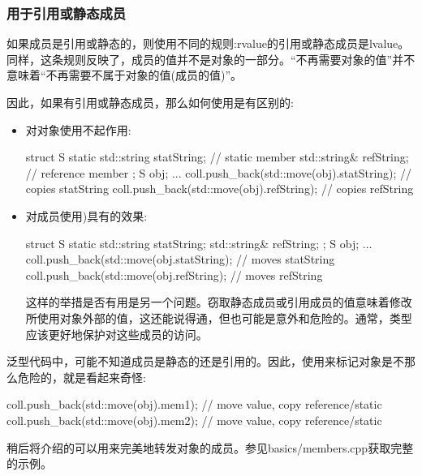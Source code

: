 \subsubsection{用于引用或静态成员}

如果成员是引用或静态的，则使用不同的规则:rvalue的引用或静态成员是lvalue。同样，这条规则反映了，成员的值并不是对象的一部分。“不再需要对象的值”并不意味着“不再需要不属于对象的值(成员的值)”。

因此，如果有引用或静态成员，那么如何使用是有区别的:

\begin{itemize}
	\item 对对象使用不起作用:

	\begin{cppcode}
struct S {
	static std::string statString; // static member
	std::string& refString; // reference member
};
S obj;
...
coll.push_back(std::move(obj).statString); // copies statString
coll.push_back(std::move(obj).refString); // copies refString
	\end{cppcode}
	\item 对成员使用)具有的效果:

	\begin{cppcode}
struct S {
	static std::string statString;
	std::string& refString;
};
S obj;
...
coll.push_back(std::move(obj.statString); // moves statString
coll.push_back(std::move(obj.refString); // moves refString
	\end{cppcode}
	这样的举措是否有用是另一个问题。窃取静态成员或引用成员的值意味着修改所使用对象外部的值，这还能说得通，但也可能是意外和危险的。通常，类型应该更好地保护对这些成员的访问。

\end{itemize}

泛型代码中，可能不知道成员是静态的还是引用的。因此，使用来标记对象是不那么危险的，就是看起来奇怪:

\begin{cppcode}
coll.push_back(std::move(obj).mem1); // move value, copy reference/static
coll.push_back(std::move(obj).mem2); // move value, copy reference/static
\end{cppcode}

稍后将介绍的可以用来完美地转发对象的成员。参见basics/members.cpp获取完整的示例。
























